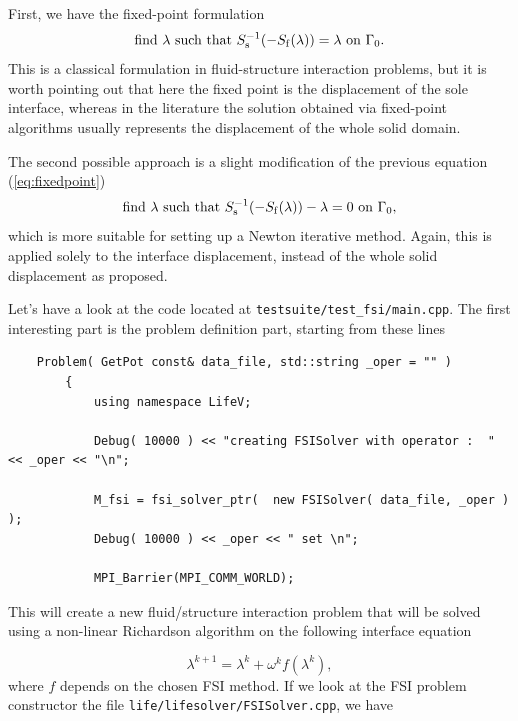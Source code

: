 First, we have the fixed-point formulation
\begin{equation} \label{eq:fixedpoint}
\mbox{find } \lambda \mbox { such that } S_{\mathrm{s}}^{-1}(-S_{\mathrm{f}}(\lambda)) = \lambda
\mbox{ on } \Gamma_0 .
\end{equation}
This is a classical formulation in fluid-structure interaction problems, but it is worth pointing
out that here the fixed point is the displacement of the sole interface, whereas in the
literature the solution obtained via
fixed-point algorithms usually represents the displacement of the whole solid domain.

The second possible approach is a slight modification of the previous equation
(\ref{eq:fixedpoint})
\begin{equation} \label{eq:newton}
\mbox{find } \lambda \mbox { such that } S_{\mathrm{s}}^{-1}(-S_{\mathrm{f}}(\lambda)) - \lambda = 0 \mbox{ on } \Gamma_0,
\end{equation}
which is more suitable for setting up a Newton iterative method.
Again, this is applied solely to the interface displacement,
instead of the whole solid displacement as proposed.

Let's have a look at the code located at \verb!testsuite/test_fsi/main.cpp!. The first interesting part
is the problem definition part, starting from these lines 
\begin{verbatim}
    Problem( GetPot const& data_file, std::string _oper = "" )
        {
            using namespace LifeV;

            Debug( 10000 ) << "creating FSISolver with operator :  " << _oper << "\n";

            M_fsi = fsi_solver_ptr(  new FSISolver( data_file, _oper ) );
            Debug( 10000 ) << _oper << " set \n";

            MPI_Barrier(MPI_COMM_WORLD);
\end{verbatim}

This will create a new fluid/structure interaction problem that will be solved using a
non-linear Richardson algorithm on the following interface equation 

\begin{equation}\label{eqn-interface}
\lambda^{k+1}  =  \lambda^k + \omega^k f(\lambda^k),
\end{equation}
where $f$ depends on the chosen FSI method. If we look at the FSI problem constructor
the file \verb!life/lifesolver/FSISolver.cpp!, we have 

